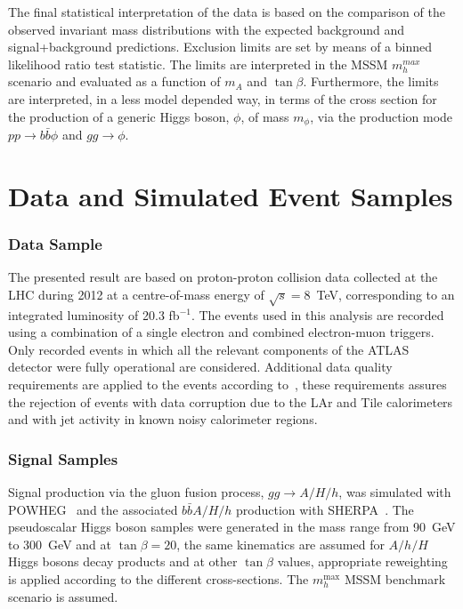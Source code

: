 The final statistical interpretation of the data is based on the 
comparison of the observed invariant mass distributions with the expected background and signal+background
predictions. Exclusion limits are set by means of a binned likelihood ratio
test statistic. The limits are interpreted  in the MSSM $m_{h}^{max}$ scenario and evaluated as a function
of $m_A$ and $\tan\beta$. Furthermore, the limits are interpreted, in a less model depended
way, in terms of the cross section for the production of a generic Higgs boson, $\phi$, of mass  $m_\phi$, 
via the production mode $pp \rightarrow b\bar{b}\phi$ and $gg \rightarrow \phi$.


 




\section{Data and Simulated Event Samples}
\label{sec:sample}
\subsubsection{Data Sample}

The  presented result  are based on proton-proton collision data
collected at the LHC during 2012 at a centre-of-mass energy of $\sqrt{s}=8$~TeV,
corresponding to an integrated luminosity of 20.3 fb$^{-1}$.
The events used in this analysis are recorded using a combination of a
single electron and combined electron-muon triggers. Only recorded events 
in which all the relevant components of the ATLAS detector were
fully operational are considered.
Additional data quality requirements are applied to the events according to~\cite{ATLASCLEANING},
these requirements assures the rejection of  events with data corruption due to the LAr and Tile calorimeters and
with jet activity in known noisy calorimeter regions. 




\subsubsection{Signal Samples}
Signal production via the gluon fusion process, $gg\rightarrow A/H/h$,
was simulated with POWHEG~\cite{POWHEG} and the associated
$b\bar{b}A/H/h$ production with SHERPA~\cite{SHERPA}.  The
pseudoscalar Higgs boson samples were generated in the mass range from
90~GeV to 300~GeV and at $\tan\beta = 20$, the same kinematics
are assumed for $A/h/H$ Higgs bosons decay products and at other
$\tan\beta$ values, appropriate reweighting is applied according to the
different cross-sections. The $m_h^{\mathrm{max}}$ MSSM benchmark
scenario is assumed.


